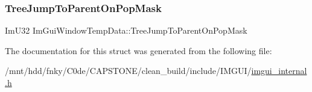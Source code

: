 \subsubsection{\texorpdfstring{Tree\+Jump\+To\+Parent\+On\+Pop\+Mask}{TreeJumpToParentOnPopMask}}
{\footnotesize\ttfamily Im\+U32 Im\+Gui\+Window\+Temp\+Data\+::\+Tree\+Jump\+To\+Parent\+On\+Pop\+Mask}



The documentation for this struct was generated from the following file\+:\begin{DoxyCompactItemize}
\item 
/mnt/hdd/fnky/\+C0de/\+C\+A\+P\+S\+T\+O\+N\+E/clean\+\_\+build/include/\+I\+M\+G\+U\+I/\hyperlink{imgui__internal_8h}{imgui\+\_\+internal.\+h}\end{DoxyCompactItemize}
